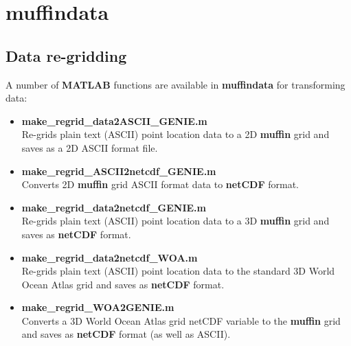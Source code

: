 
\cleardoublepage


\chapter{muffindata}\label{ch:muffindata}

\hfill \break
\vspace{24mm}

\newpage

\section{Data re-gridding}

A number of \textbf{MATLAB} functions are available in \textbf{muffindata} for transforming data:

\vspace{1mm}
\begin{itemize}[noitemsep]
\vspace{1mm}
\item \textbf{make\_regrid\_data2ASCII\_GENIE.m}
\\Re-grids plain text (ASCII) point location data to a 2D \textbf{muffin} grid and saves as a 2D ASCII format file. 
\vspace{1mm}
\item \textbf{make\_regrid\_ASCII2netcdf\_GENIE.m}
\\Converts 2D \textbf{muffin} grid ASCII format data to \textbf{netCDF} format. 
\vspace{1mm}
\item \textbf{make\_regrid\_data2netcdf\_GENIE.m}
\\Re-grids plain text (ASCII) point location data to a 3D \textbf{muffin} grid and saves as \textbf{netCDF} format.
\vspace{1mm}
\item \textbf{make\_regrid\_data2netcdf\_WOA.m}
\\Re-grids plain text (ASCII) point location data to the standard 3D World Ocean Atlas grid and saves as \textbf{netCDF} format.
\vspace{1mm}
\item \textbf{make\_regrid\_WOA2GENIE.m}
\\Converts a 3D World Ocean Atlas grid netCDF variable to the \textbf{muffin} grid and saves as \textbf{netCDF} format (as well as ASCII).
\end{itemize}

